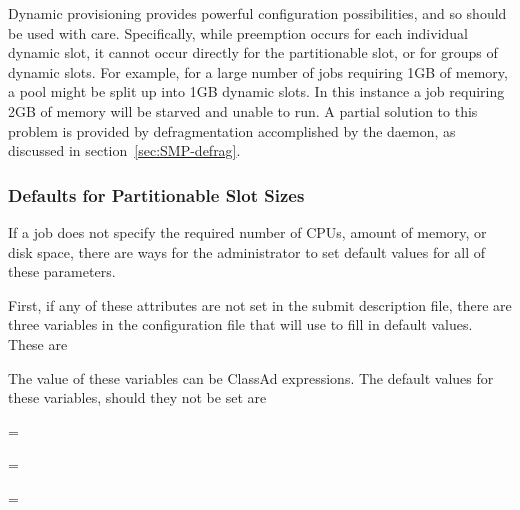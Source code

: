 Dynamic provisioning provides powerful configuration
possibilities, and so should be used with care. 
Specifically, while preemption occurs for each individual dynamic slot,
it cannot occur directly for the partitionable slot, 
or for groups of dynamic slots. 
For example, for a large number of jobs requiring 1GB of memory,
a pool might be split up into 1GB dynamic slots. 
In this instance a job requiring 2GB of memory will be starved
and unable to run.  A partial solution to this problem is provided
by defragmentation accomplished by the  daemon,
as discussed in section~\ref{sec:SMP-defrag}.

\subsubsection{\label{sec:SMP-resource-defaults}
Defaults for Partitionable Slot Sizes}

If a job does not specify the required number of CPUs, amount of memory,
or disk space, there are ways for the administrator to set default
values for all of these parameters.

First, if any of these attributes are not set in the submit description file,
there are three variables in the configuration file that 
will use to fill in default values.  These are

\begin{description}
  \item{}
  \item{}
  \item{}
\end{description}

The value of these variables can be ClassAd expressions.  
The default values for these variables, should they not be set are

\begin{description}
  \item{ = }
  \item{ = }
  \item{ = }
\end{description}

